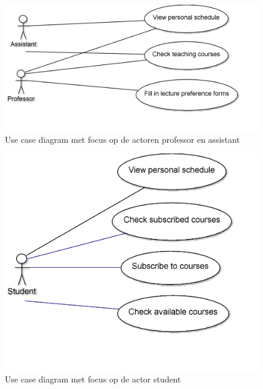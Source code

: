 \begin{figure}[H]
	\centering
	\includegraphics[scale=0.2]{img/useCaseProf}
	\caption{Use case diagram met focus op de actoren professor en assistant}
	\label{fig:useCaseProf}
\end{figure}

\begin{figure}[H]
	\centering
	\includegraphics[scale=0.2]{img/useCaseStudent}
	\caption{Use case diagram met focus op de actor student}
	\label{fig:useCaseStudent}
\end{figure}